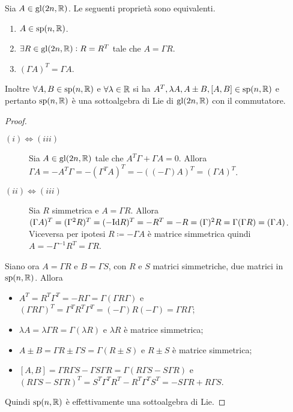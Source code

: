 \begin{thm} \label{thm:mat-sp}
    Sia $ A \in \mathrm{gl}(2n, \mathbb{R}) $. Le seguenti proprietà sono equivalenti.
    \begin{enumerate}[label=(\roman*)]
        \item $ A \in \mathrm{sp}(n, \mathbb{R}) $.
        \item $ \exists R \in \mathrm{gl}(2n, \mathbb{R}) : R = R^T $ tale che $ A = \Gamma R $.
        \item $ (\Gamma A)^T = \Gamma A $.
    \end{enumerate}
    Inoltre $ \forall A, B \in \mathrm{sp}(n, \mathbb{R}) $ e $ \forall \lambda \in \mathbb{R} $ si ha $ A^T, \lambda A, A \pm B, [A, B] \in \mathrm{sp}(n, \mathbb{R}) $ e pertanto $ \mathrm{sp}(n, \mathbb{R}) $ è una sottoalgebra di Lie di $ \mathrm{gl}(2n, \mathbb{R}) $ con il commutatore.
\end{thm}
\begin{proof}
    \begin{description}
        \item[$ (i) \iff (iii) $] Sia $ A \in \mathrm{gl}(2n, \mathbb{R}) $ tale che $ A^T \Gamma + \Gamma A = 0 $. Allora $ \Gamma A = - A^T \Gamma = - (\Gamma^T A)^T = - ((-\Gamma) A)^T = (\Gamma A)^T $.
        \item[$ (ii) \iff (iii) $] Sia $ R $ simmetrica e $ A = \Gamma R $. Allora $ (\Gamma A)^T = (\Gamma^2 R)^T = (-\mathrm{Id} R)^T = -R^T = -R = (\Gamma)^2 R = \Gamma (\Gamma R) = (\Gamma A) $. Viceversa per ipotesi $ R \coloneqq -\Gamma A $ è matrice simmetrica quindi $ A = - \Gamma^{-1} R^T = \Gamma R $.
    \end{description}
    Siano ora $ A = \Gamma R $ e $ B = \Gamma S $, con $ R $ e $ S $ matrici simmetriche, due matrici in $ \mathrm{sp}(n, \mathbb{R}) $. Allora
    \begin{itemize}
        \item $ A^T = R^T \Gamma^T = - R \Gamma = \Gamma (\Gamma R \Gamma) $ e $ (\Gamma R \Gamma)^T = \Gamma^T R^T \Gamma^T = (-\Gamma) R (-\Gamma) = \Gamma R \Gamma $;
        \item $ \lambda A = \lambda \Gamma R = \Gamma (\lambda R) $ e $ \lambda R $ è matrice simmetrica;
        \item $ A \pm B = \Gamma R \pm \Gamma S = \Gamma (R \pm S) $ e $ R \pm S $ è matrice simmetrica;
        \item $ [A, B] = \Gamma R \Gamma S - \Gamma S \Gamma R = \Gamma (R \Gamma S - S \Gamma R) $ e $ (R \Gamma S - S \Gamma R)^T = S^T \Gamma^T R^T - R^T \Gamma^T S^T = - S \Gamma R + R \Gamma S $.
    \end{itemize}
    Quindi $ \mathrm{sp}(n, \mathbb{R}) $ è effettivamente una sottoalgebra di Lie.
\end{proof}

